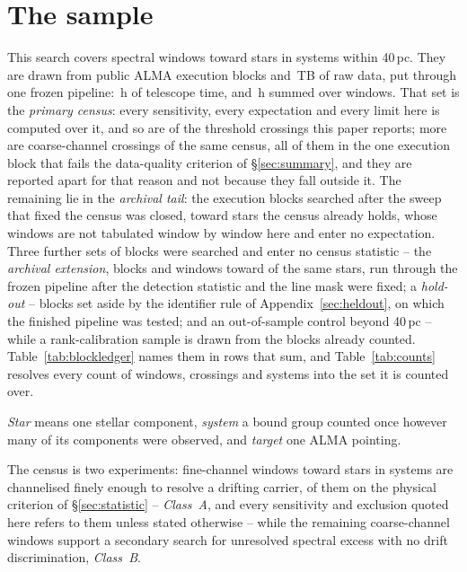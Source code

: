 \section{The sample}
\label{sec:sample}

This search covers \NWindows{} spectral windows toward \NStars{} stars in
\NSystems{} systems within 40\,pc. They are drawn from \NEB{} public ALMA
execution blocks and \TotalDataTB\,TB of raw data, put through one frozen
pipeline: \StTelHours\,h of telescope time, and \LdgCensusHours\,h summed
over windows. That set is the \emph{primary census}: every
sensitivity, every expectation and every limit here is computed over it, and
so are \MtCrossACen{} of the \EvNCrossRaw{} threshold crossings this paper
reports; \LdgNCrossB{} more are coarse-channel crossings of the same census,
all of them in the one execution block that fails the data-quality criterion
of \S\ref{sec:summary}, and they are reported apart for that reason and not
because they fall outside it. The remaining \CeNTailCross{} lie in the
\emph{archival tail}: the \LdgExtTail{} execution blocks searched after the
sweep that fixed the census was closed, toward stars the census already holds,
whose \LdgExtTailWin{} windows are not tabulated window by window here and
enter no expectation. Three further sets of blocks were searched and enter no
census statistic -- the \emph{archival extension}, \LdgExtEB{} blocks and
\LdgExtWin{} windows toward \LdgExtStars{} of the same stars, run through the
frozen pipeline after the detection statistic and the line mask were fixed; a
\emph{hold-out} -- blocks set aside by the identifier rule of
Appendix~\ref{sec:heldout}, on which the finished pipeline was tested;
and an out-of-sample control beyond 40\,pc -- while a rank-calibration sample
is drawn from the blocks already counted.
Table~\ref{tab:blockledger} names them in rows that sum, and
Table~\ref{tab:counts} resolves every count of windows, crossings and systems
into the set it is counted over.

\emph{Star} means one stellar component, \emph{system} a bound group
counted once however many of its components were observed, and \emph{target}
one ALMA pointing.

The census is two experiments: \NWinA{} fine-channel windows toward
\LdgClassAStars{} stars in \NSysClassA{} systems are channelised finely
enough to resolve a drifting carrier, \EtaDriftAOk{} of them on the physical
criterion of \S\ref{sec:statistic}
-- \emph{Class~A}, and every sensitivity and exclusion quoted here refers to
them unless stated otherwise -- while the remaining \NWinB{} coarse-channel
windows support a secondary search for unresolved spectral excess with no
drift discrimination, \emph{Class~B}.

